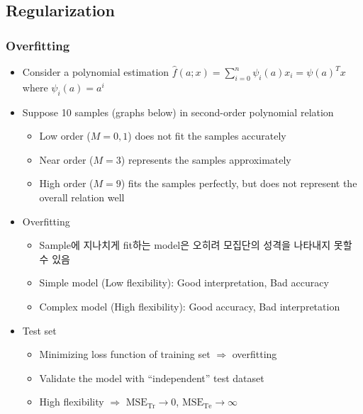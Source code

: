 \subsection{Regularization}

\subsubsection*{Overfitting}
\begin{itemize}
    \item Consider a polynomial estimation $\hat{f}(a;x)=\sum_{i=0}^n\psi_i(a)x_i=\psi(a)^Tx$ where $\psi_i(a)=a^i$
    \item Suppose 10 samples (graphs below) in second-order polynomial relation
    \begin{itemize}
        \item Low order ($M=0,1$) does not fit the samples accurately
        \item Near order ($M=3$) represents the samples approximately
        \item High order ($M=9$) fits the samples perfectly, but does not represent the overall relation well
    \end{itemize}
    \begin{figures}
    \end{figures}
    \item Overfitting
    \begin{itemize}
        \item Sample에 지나치게 fit하는 model은 오히려 모집단의 성격을 나타내지 못할 수 있음
        \item Simple model (Low flexibility): Good interpretation, Bad accuracy
        \item Complex model (High flexibility): Good accuracy, Bad interpretation
    \end{itemize}
    \begin{figures}
    \end{figures}
    \item Test set
    \begin{itemize}
        \item Minimizing loss function of training set $\Rightarrow$ overfitting
        \item Validate the model with ``independent'' test dataset
        \item High flexibility $\Rightarrow$ $\mathrm{MSE_{Tr}}\to 0$, $\mathrm{MSE_{Te}}\to\infty$
    \end{itemize}
\end{itemize}

